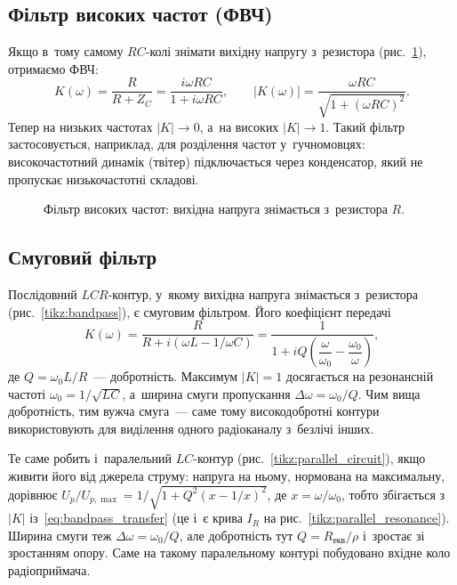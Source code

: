 \subsection*{Фільтр високих частот (ФВЧ)}

Якщо в~тому самому $RC$-колі знімати вихідну напругу з~резистора (рис.~\ref{tikz:highpass}), отримаємо ФВЧ:
\begin{equation*}
	K(\omega) = \frac{R}{R + Z_C} = \frac{i\omega RC}{1 + i\omega RC},
	\qquad
	|K(\omega)| = \frac{\omega RC}{\sqrt{1 + (\omega RC)^2}}.
\end{equation*}
Тепер на низьких частотах $|K| \to 0$, а~на високих $|K| \to 1$. Такий фільтр застосовується, наприклад, для розділення частот у~гучномовцях: високочастотний динамік (твітер) підключається через конденсатор, який не пропускає низькочастотні складові.

\begin{figure}
	\centering
	\caption{Фільтр високих частот: вихідна напруга знімається з~резистора $R$.}
	\label{tikz:highpass}
\end{figure}

\subsection*{Смуговий фільтр}
Послідовний $LCR$-контур, у~якому вихідна напруга знімається з~резистора (рис.~\ref{tikz:bandpass}), є смуговим фільтром. Його коефіцієнт передачі
\begin{equation}\label{eq:bandpass_transfer}
	K(\omega) = \frac{R}{R + i(\omega L - 1/\omega C)}
	          = \frac{1}{1 + iQ\left(\dfrac{\omega}{\omega_0} - \dfrac{\omega_0}{\omega}\right)},
\end{equation}
де $Q = \omega_0 L/R$~--- добротність. Максимум $|K| = 1$ досягається на резонансній частоті $\omega_0 = 1/\sqrt{LC}$, а~ширина смуги пропускання $\Delta\omega = \omega_0/Q$. Чим вища добротність, тим вужча смуга~--- саме тому високодобротні контури використовують для виділення одного радіоканалу з~безлічі інших.

Те саме робить і~паралельний $LC$-контур (рис.~\ref{tikz:parallel_circuit}), якщо живити його від джерела струму: напруга на ньому, нормована на максимальну, дорівнює $U_p/U_{p,\max} = 1/\sqrt{1 + Q^2(x - 1/x)^2}$, де $x = \omega/\omega_0$, тобто збігається з~$|K|$ із~\eqref{eq:bandpass_transfer} (це і~є крива $I_R$ на рис.~\ref{tikz:parallel_resonance}). Ширина смуги теж $\Delta\omega = \omega_0/Q$, але добротність тут $Q = R_{\text{екв}}/\rho$ і~зростає зі зростанням опору. Саме на такому паралельному контурі побудовано вхідне коло радіоприймача.

